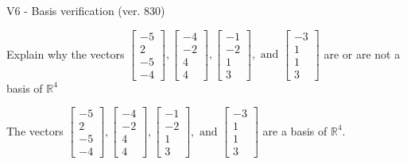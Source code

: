\begin{exercise}
  \begin{exerciseTitle}V6 - Basis verification (ver. 830)\end{exerciseTitle}
  \begin{exerciseStatement}
    Explain why the vectors \(\left[\begin{array}{r}
-5 \\
2 \\
-5 \\
-4
\end{array}\right] , \left[\begin{array}{r}
-4 \\
-2 \\
4 \\
4
\end{array}\right] , \left[\begin{array}{r}
-1 \\
-2 \\
1 \\
3
\end{array}\right] , \text{ and } \left[\begin{array}{r}
-3 \\
1 \\
1 \\
3
\end{array}\right]\) are or are not a basis of \(\mathbb{R}^4\)	


  \end{exerciseStatement}
  \begin{exerciseAnswer}
   The vectors \(\left[\begin{array}{r}
-5 \\
2 \\
-5 \\
-4
\end{array}\right] , \left[\begin{array}{r}
-4 \\
-2 \\
4 \\
4
\end{array}\right] , \left[\begin{array}{r}
-1 \\
-2 \\
1 \\
3
\end{array}\right] , \text{ and } \left[\begin{array}{r}
-3 \\
1 \\
1 \\
3
\end{array}\right]\) 
  	 are  a basis of \(\mathbb{R}^4\).
  


  \end{exerciseAnswer}
\end{exercise}